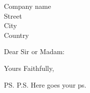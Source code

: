 \documentclass[12pt]{letter}
\begin{document}
\begin{letter}{Company name \\ Street\\ City\\ Country}
\opening{Dear Sir or Madam:}
\lipsum[1-4]

\begin{flushright}
   \closing{Yours Faithfully,}
\end{flushright}


\ps{P.S. Here goes your ps.}
\end{letter}
\end{document}
